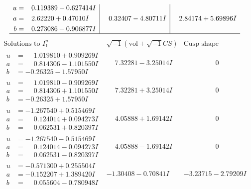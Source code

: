\documentclass[1p]{elsarticle_modified}
\theoremstyle{definition}
\newcommand{\I}{\sqrt{-1}}
\begin{document}
$$\begin{array}{c|c|c}
\begin{aligned}
u &= \phantom{-}0.119389 - 0.627414 I \\
a &= \phantom{-}2.62220 + 0.47010 I \\
b &= \phantom{-}0.273086 + 0.906877 I\end{aligned}
 & \phantom{-}0.32407 - 4.80711 I & \phantom{-}2.84174 + 5.69896 I\\
 \hline 
 \end{array}$$\newpage$$\begin{array}{c|c|c}  
\text{Solutions to }I^u_{1}& \I (\text{vol} + \sqrt{-1}CS) & \text{Cusp shape}\\
 \hline 
\begin{aligned}
u &= \phantom{-}1.019810 + 0.909269 I \\
a &= \phantom{-}0.814306 - 1.101550 I \\
b &= -0.26325 - 1.57950 I\end{aligned}
 & \phantom{-}7.32281 - 3.25014 I & \phantom{-0.000000 } 0 \\ \hline\begin{aligned}
u &= \phantom{-}1.019810 - 0.909269 I \\
a &= \phantom{-}0.814306 + 1.101550 I \\
b &= -0.26325 + 1.57950 I\end{aligned}
 & \phantom{-}7.32281 + 3.25014 I & \phantom{-0.000000 } 0 \\ \hline\begin{aligned}
u &= -1.267540 + 0.515469 I \\
a &= \phantom{-}0.124014 + 0.094273 I \\
b &= \phantom{-}0.062531 + 0.820397 I\end{aligned}
 & \phantom{-}4.05888 + 1.69142 I & \phantom{-0.000000 } 0 \\ \hline\begin{aligned}
u &= -1.267540 - 0.515469 I \\
a &= \phantom{-}0.124014 - 0.094273 I \\
b &= \phantom{-}0.062531 - 0.820397 I\end{aligned}
 & \phantom{-}4.05888 - 1.69142 I & \phantom{-0.000000 } 0 \\ \hline\begin{aligned}
u &= -0.571300 + 0.255504 I \\
a &= -0.152207 + 1.389420 I \\
b &= \phantom{-}0.055604 - 0.780948 I\end{aligned}
 & -1.30408 - 0.70841 I & -3.23715 - 2.79209 I \\ \hline\begin{aligned}

\end{aligned}
\end{array}$$
\end{document}
